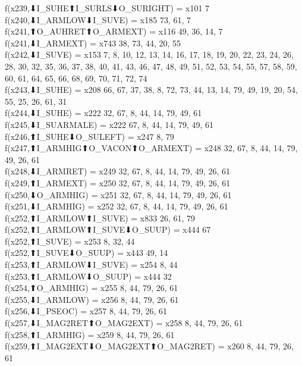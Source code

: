 f(x239,⬇I_SUHE⬆I_SURLS⬇O_SURIGHT) = x101 {7} \\
f(x240,⬇I_ARMLOW⬇I_SUVE) = x185 {73, 61, 7} \\
f(x241,⬆O_AUHRET⬆O_ARMEXT) = x116 {49, 36, 14, 7} \\
f(x241,⬇I_ARMEXT) = x743 {38, 73, 44, 20, 55} \\
f(x242,⬇I_SUVE) = x153 {7, 8, 10, 12, 13, 14, 16, 17, 18, 19, 20, 22, 23, 24, 26, 28, 30, 32, 35, 36, 37, 38, 40, 41, 43, 46, 47, 48, 49, 51, 52, 53, 54, 55, 57, 58, 59, 60, 61, 64, 65, 66, 68, 69, 70, 71, 72, 74} \\
f(x243,⬇I_SUHE) = x208 {66, 67, 37, 38, 8, 72, 73, 44, 13, 14, 79, 49, 19, 20, 54, 55, 25, 26, 61, 31} \\
f(x244,⬇I_SUHE) = x222 {32, 67, 8, 44, 14, 79, 49, 61} \\
f(x245,⬇I_SUARMALE) = x222 {67, 8, 44, 14, 79, 49, 61} \\
f(x246,⬆I_SUHE⬇O_SULEFT) = x247 {8, 79} \\
f(x247,⬆I_ARMHIG⬆O_VACON⬆O_ARMEXT) = x248 {32, 67, 8, 44, 14, 79, 49, 26, 61} \\
f(x248,⬇I_ARMRET) = x249 {32, 67, 8, 44, 14, 79, 49, 26, 61} \\
f(x249,⬆I_ARMEXT) = x250 {32, 67, 8, 44, 14, 79, 49, 26, 61} \\
f(x250,⬇O_ARMHIG) = x251 {32, 67, 8, 44, 14, 79, 49, 26, 61} \\
f(x251,⬇I_ARMHIG) = x252 {32, 67, 8, 44, 14, 79, 49, 26, 61} \\
f(x252,⬆I_ARMLOW⬆I_SUVE) = x833 {26, 61, 79} \\
f(x252,⬆I_ARMLOW⬆I_SUVE⬇O_SUUP) = x444 {67} \\
f(x252,⬆I_SUVE) = x253 {8, 32, 44} \\
f(x252,⬆I_SUVE⬇O_SUUP) = x443 {49, 14} \\
f(x253,⬆I_ARMLOW⬇I_SUVE) = x254 {8, 44} \\
f(x253,⬆I_ARMLOW⬇O_SUUP) = x444 {32} \\
f(x254,⬆O_ARMHIG) = x255 {8, 44, 79, 26, 61} \\
f(x255,⬇I_ARMLOW) = x256 {8, 44, 79, 26, 61} \\
f(x256,⬇I_PSEOC) = x257 {8, 44, 79, 26, 61} \\
f(x257,⬇I_MAG2RET⬆O_MAG2EXT) = x258 {8, 44, 79, 26, 61} \\
f(x258,⬆I_ARMHIG) = x259 {8, 44, 79, 26, 61} \\
f(x259,⬆I_MAG2EXT⬇O_MAG2EXT⬆O_MAG2RET) = x260 {8, 44, 79, 26, 61} \\

